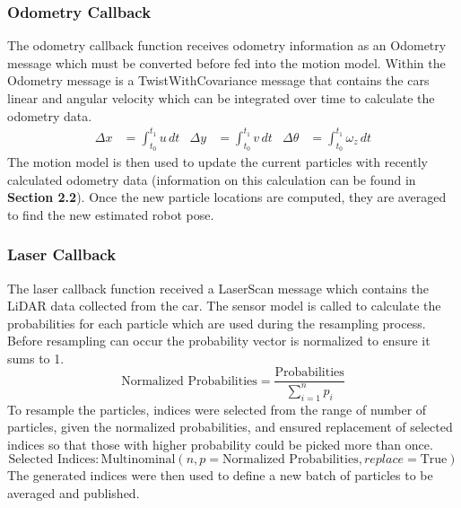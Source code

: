 \documentclass{article}
\begin{document}
\subsubsection{Odometry Callback}
The odometry callback function receives odometry information as an Odometry message which must be converted before fed into the motion model. Within the Odometry message is a TwistWithCovariance message that contains the cars linear and angular velocity which can be integrated over time to calculate the odometry data.
\begin{align*}
    \Delta x &= \int_{t_0}^{t_1} u \, dt &
    \Delta y &= \int_{t_0}^{t_1} v \, dt &
    \Delta \theta &= \int_{t_0}^{t_1} \omega_{z} \, dt 
\end{align*}
The motion model is then used to update the current particles with recently calculated odometry data (information on this calculation can be found in \textbf{Section 2.2}). Once the new particle locations are computed, they are averaged to find the new estimated robot pose. 

\subsubsection{Laser Callback}
The laser callback function received a LaserScan message which contains the LiDAR data collected from the car. The sensor model is called to calculate the probabilities for each particle which are used during the resampling process. Before resampling can occur the probability vector is normalized to ensure it sums to 1.
\begin{equation*}
    \text{Normalized Probabilities} = \frac{\text{Probabilities}}{\sum_{i=1}^{n} p_{i}}
\end{equation*}
To resample the particles, indices were selected from the range of number of particles, given the normalized probabilities, and ensured replacement of selected indices so that those with higher probability could be picked more than once.
\begin{equation*}
    \text{Selected Indices} : \text{Multinominal}(n,p=\text{Normalized Probabilities}, replace=\text{True})    
\end{equation*}
The generated indices were then used to define a new batch of particles to be averaged and published.
\end{document}

